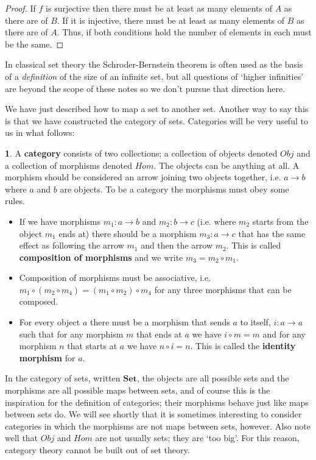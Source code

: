 \documentclass[oneside,english]{amsbook}
\numberwithin{section}{chapter}
\theoremstyle{plain}
\theoremstyle{definition}
\newtheorem{defn}[thm]{\protect\definitionname}
\providecommand{\definitionname}{Definition}
\begin{document}
\begin{proof} 
	If $f$ is surjective then there must be at least as many elements of $A$ as there are of $B$. If it is injective, there must be at least as many elements of $B$ as there are of $A$. Thus, if both conditions hold the number of elements in each must be the same. 
\end{proof} 

In classical set theory the Schroder-Bernstein theorem is often used as the basis of a \emph{definition} of the size of an infinite set, but all questions of `higher infinities' are beyond the scope of these notes so we don't pursue that direction here.

We have just described how to map a set to another set. Another way to say this is that we have constructed the category of sets. Categories will be very useful to us in what follows: 

\begin{defn} 
	A \textbf{category }consists of two collections; a collection of objects denoted \textbf{$Obj$ }and a collection of morphisms denoted $Hom$. The objects can be anything at all. A morphism should be considered an arrow joining two objects together, i.e. $a\to b$ where $a$ and $b$ are objects. To be a category the morphisms must obey some rules. 
		\begin{itemize} 
			\item If we have morphisms $m_{1}:a\to b$ and $m_{2}:b\to c$ (i.e. where $m_{2}$ starts from the object $m_{1}$ ends at) there should be a morphism $m_{3}:a\to c$ that has the same effect as following the arrow $m_{1}$ and then the arrow $m_{2}$. This is called \textbf{composition of morphisms} and we write $m_{3}=m_{2}\circ m_{1}$. 
			\item Composition of morphisms must be associative, i.e. $m_{1}\circ(m_{2}\circ m_{4})=(m_{1}\circ m_{2})\circ m_{4}$ for any three morphisms that can be composed. 
			\item For every object $a$ there must be a morphism that sends $a$ to itself, $i:a\to a$ such that for any morphism $m$ that ends at $a$ we have $i\circ m=m$ and for any morphism $n$ that starts at $a$ we have $n\circ i=n$. This is called the \textbf{identity morphism }for $a$. 
		\end{itemize} 
\end{defn}
 
In the category of sets, written $\mathbf{Set}$, the objects are all possible sets and the morphisms are all possible maps between sets, and of course this is the inspiration for the definition of categories; their morphisms behave just like maps between sets do. We will see shortly that it is sometimes interesting to consider categories in which the morphisms are not maps between sets, however. Also note well that $Obj$ and $Hom$ are not usually sets; they are `too big'. For this reason, category theory cannot be built out of set theory.
\end{document}
